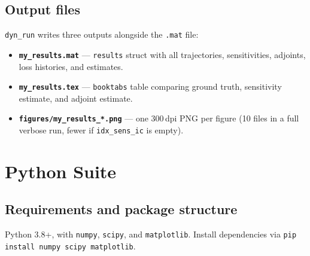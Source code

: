 \documentclass[10pt]{article}
\begin{document}
	\subsection{Output files}
	
	\texttt{dyn\_run} writes three outputs alongside the \texttt{.mat} file:
	
	\begin{itemize}
		\item \textbf{\texttt{my\_results.mat}} — \texttt{results} struct with all
		trajectories, sensitivities, adjoints, loss histories, and estimates.
		\item \textbf{\texttt{my\_results.tex}} — \texttt{booktabs} table comparing
		ground truth, sensitivity estimate, and adjoint estimate.
		\item \textbf{\texttt{figures/my\_results\_*.png}} — one 300\,dpi PNG per
		figure (10 files in a full verbose run, fewer if \texttt{idx\_sens\_ic} is empty).
	\end{itemize}
	
	\pagebreak
	
	\section{Python Suite}
	
	\subsection{Requirements and package structure}
	
	Python 3.8+, with \texttt{numpy}, \texttt{scipy}, and \texttt{matplotlib}.
	Install dependencies via \texttt{pip install numpy scipy matplotlib}.
	
\end{document}
